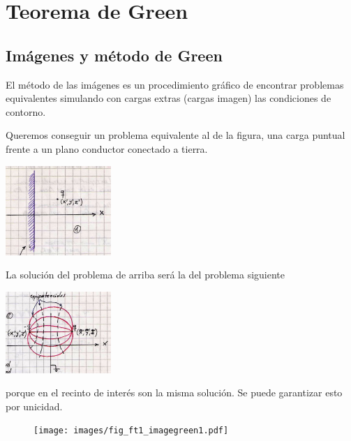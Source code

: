 \documentclass[10pt,oneside]{CBFT_book}
\begin{document}
\chapter{Teorema de Green}

\section{Imágenes y método de Green}

El método de las imágenes es un procedimiento gráfico de encontrar problemas equivalentes simulando
con cargas extras (cargas imagen) las condiciones de contorno.

Queremos conseguir un problema equivalente al de la figura, una carga puntual frente a un plano
conductor conectado a tierra.

\includegraphics[width=0.3\textwidth]{images/fig_ft1_imagenes1.jpg}

La solución del problema de arriba será la del problema siguiente 

\includegraphics[width=0.3\textwidth]{images/fig_ft1_imagenes2.jpg}

porque en el recinto de interés son la misma solución. Se puede garantizar esto por unicidad.

\begin{figure}[htb]
	\begin{center}
	\texttt{[image: images/fig\_ft1\_imagegreen1.pdf]}	 
	\end{center}
	\caption{}
\end{figure} 
\end{document}
